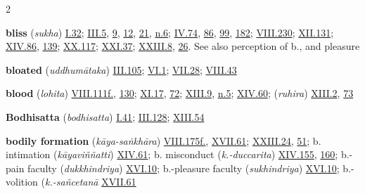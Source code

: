 \begin{multicols}{2}
\begin{vismHanging}
\par\textbf{bliss} (\emph{sukha}) \hyperlink{I.32}{I.32}{}; \hyperlink{III.5}{III.5}{}, \hyperlink{III.9}{9}{}, \hyperlink{III.12}{12}{}, \hyperlink{III.21}{21}{}, \hyperlink{III.n6}{n.6}{}; \hyperlink{IV.74}{IV.74}{}, \hyperlink{IV.86}{86}{}, \hyperlink{IV.99}{99}{}, \hyperlink{IV.182}{182}{}; \hyperlink{VIII.230}{VIII.230}{}; \hyperlink{XII.131}{XII.131}{}; \hyperlink{XIV.86}{XIV.86}{}, \hyperlink{XIV.139}{139}{}; \hyperlink{XX.117}{XX.117}{}; \hyperlink{XXI.37}{XXI.37}{}; \hyperlink{XXIII.8}{XXIII.8}{}, \hyperlink{XXIII.26}{26}{}. See also perception of b., and pleasure 
\par\textbf{bloated} (\emph{uddhumātaka}) \hyperlink{III.105}{III.105}{}; \hyperlink{VI.1}{VI.1}{}; \hyperlink{VII.28}{VII.28}{}; \hyperlink{VIII.43}{VIII.43}{}
\par\textbf{blood} (\emph{lohita}) \hyperlink{VIII.111}{VIII.111f.}{}, \hyperlink{VIII.130}{130}{}; \hyperlink{XI.17}{XI.17}{}, \hyperlink{XI.72}{72}{}; \hyperlink{XIII.9}{XIII.9}{}, \hyperlink{XIII.n5}{n.5}{}; \hyperlink{XIV.60}{XIV.60}{}; (\emph{ruhira}) \hyperlink{XIII.2}{XIII.2}{}, \hyperlink{XIII.73}{73}{}
\par\textbf{Bodhisatta} (\emph{bodhisatta}) \hyperlink{I.41}{I.41}{}; \hyperlink{III.128}{III.128}{}; \hyperlink{XIII.54}{XIII.54}{}
\par\textbf{bodily formation} (\emph{kāya-saṅkhāra}) \hyperlink{VIII.175}{VIII.175f.}{}, \hyperlink{XVII.61}{XVII.61}{}; \hyperlink{XXIII.24}{XXIII.24}{}, \hyperlink{XXIII.51}{51}{}; b. intimation (\emph{kāyaviññatti}) \hyperlink{XIV.61}{XIV.61}{}; b. misconduct (\emph{k.-duccarita}) \hyperlink{XIV.155}{XIV.155}{}, \hyperlink{XIV.160}{160}{}; b.-pain faculty (\emph{dukkhindriya}) \hyperlink{XVI.10}{XVI.10}{}; b.-pleasure faculty (\emph{sukhindriya}) \hyperlink{XVI.10}{XVI.10}{}; b.-volition (\emph{k.-sañcetanā }\hyperlink{XVII.61}{XVII.61}{}

\end{vismHanging}
\end{multicols}
